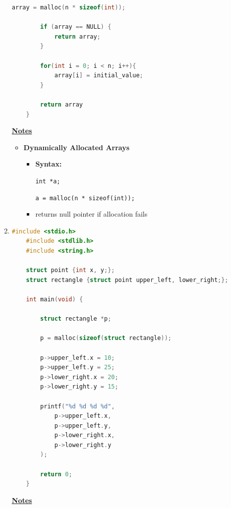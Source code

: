 \documentclass[12pt]{article}
\begin{document}
\begin{enumerate}[1.]
\begin{lstlisting}[language=c]
        array = malloc(n * sizeof(int));

        if (array == NULL) {
            return array;
        }

        for(int i = 0; i < n; i++){
            array[i] = initial_value;
        }

        return array
    }
\end{lstlisting}


    \bigskip

    \underline{\textbf{Notes}}

    \begin{itemize}
        \item \textbf{Dynamically Allocated Arrays}
        \begin{itemize}
            \item \textbf{Syntax:}

            \bigskip

            \texttt{int *a;}

            \texttt{a = malloc(n * sizeof(int));}

            \bigskip
            \item returns null pointer if allocation fails
        \end{itemize}
    \end{itemize}

    \item

    \bigskip

\begin{lstlisting}[language=c]
    #include <stdio.h>
    #include <stdlib.h>
    #include <string.h>

    struct point {int x, y;};
    struct rectangle {struct point upper_left, lower_right;};

    int main(void) {

        struct rectangle *p;

        p = malloc(sizeof(struct rectangle));

        p->upper_left.x = 10;
        p->upper_left.y = 25;
        p->lower_right.x = 20;
        p->lower_right.y = 15;

        printf("%d %d %d %d",
            p->upper_left.x,
            p->upper_left.y,
            p->lower_right.x,
            p->lower_right.y
        );

        return 0;
    }
\end{lstlisting}

    \underline{\textbf{Notes}}


\end{enumerate}
\end{document}
